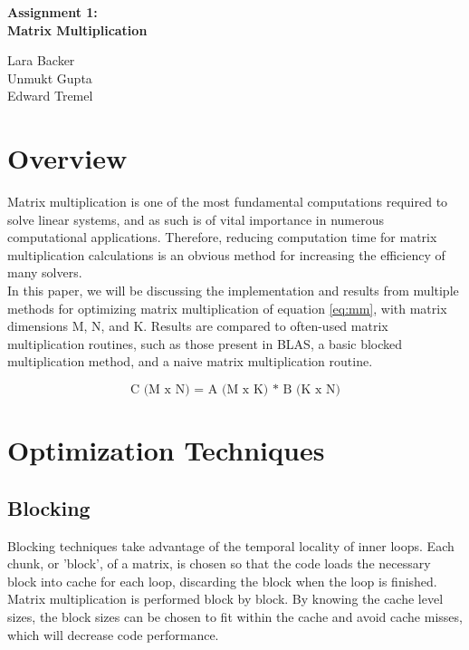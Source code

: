 \documentclass{article}	 %
\begin{document}
\begin{center}
    \Large
    \textbf{Assignment 1: \\ Matrix Multiplication}
    
    \vspace{0.4cm}
    \large
        
    \vspace{0.4cm}
    Lara Backer \\ Unmukt Gupta \\ Edward Tremel

\end{center}


\section{Overview}

Matrix multiplication is one of the most fundamental computations required to solve linear systems, and as such is of vital importance in numerous computational applications. Therefore, reducing computation time for matrix multiplication calculations is an obvious method for increasing the efficiency of many solvers. \\

In this paper, we will be discussing the implementation and results from multiple methods for optimizing matrix multiplication of equation \ref{eq:mm}, with matrix dimensions M, N, and K. Results are compared to often-used matrix multiplication routines, such as those present in BLAS, a basic blocked multiplication method, and a naive matrix multiplication routine. 

\begin{equation}
\text{C (M x N) = A (M x K) * B (K x N)}
\label{eq:mm}
\end{equation}

\section{Optimization Techniques}

\subsection{Blocking}
Blocking techniques take advantage of the temporal locality of inner loops. Each chunk, or 'block', of a matrix, is chosen so that the code loads the necessary block into cache for each loop, discarding the block when the loop is finished. Matrix multiplication is performed block by block. By knowing the cache level sizes, the block sizes can be chosen to fit within the cache and avoid cache misses, which will decrease code performance. \\ 
\end{document}
